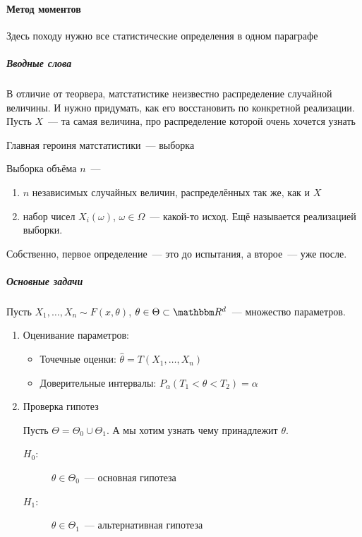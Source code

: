 \documentclass[12pt,timbord]{../../../notes}
\begin{document}
\paragraph{Метод моментов}
\label{par:stat::mom}

Здесь походу нужно все статистические определения в одном параграфе \flame

\subparagraph{Вводные слова}
В отличие от теорвера, матстатистике неизвестно распределение случайной величины. И нужно
придумать, как его восстановить по конкретной реализации. Пусть $X$~--- та самая величина,
про распределение которой очень хочется узнать

Главная героиня матстатистики~--- выборка
\begin{defn}\label{defn:stat::mom::chosen}
  Выборка объёма $n$~--- 
  \begin{enumerate}
    \item $n$ независимых случайных величин, распределённых так же, как и $X$
    \item набор чисел $X_i(\omega)$, $\omega \in \Omega$~--- какой-то исход. Ещё называется
      реализацией выборки.
  \end{enumerate}
  Собственно, первое определение~--- это до испытания, а второе~--- уже после.
\end{defn}

\subparagraph{Основные задачи}
Пусть $X_1, \dotsc, X_n \sim F(x,\theta)$, $\theta \in \Theta \subset \R^d$~--- множество
параметров.

\begin{enumerate}
  \item Оценивание параметров:
    \begin{itemize}
      \item Точечные оценки: $\hat\theta = T(X_1, \dotsc, X_n)$
      \item Доверительные интервалы: $P_\alpha (T_1 < \theta < T_2) = \alpha$
    \end{itemize}
  \item Проверка гипотез\par
    Пусть $\Theta = \Theta_0 \cup \Theta_1$. А мы хотим узнать чему принадлежит $\theta$. 
    \begin{description}
      \item[$H_0$:] $\theta\in \Theta_0$~--- основная гипотеза 
      \item[$H_1$:] $\theta\in \Theta_1$~--- альтернативная гипотеза 
    \end{description}
\end{enumerate}
\end{document}
